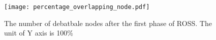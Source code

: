 \begin{figure}[ht!]
  \centering
  \texttt{[image: percentage\_overlapping\_node.pdf]}
  \caption{The number of debatbale nodes after the first phase of ROSS. The unit of Y axis is 100\%}\label{percentage_overlapping_node}
\end{figure}





%


